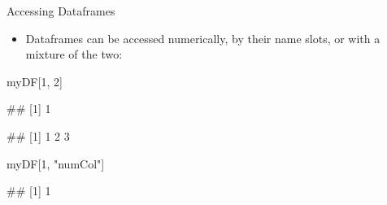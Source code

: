 \documentclass[
  ignorenonframetext,
  aspectratio=169]{beamer}
\newenvironment{Shaded}{\begin{snugshade}}{\end{snugshade}}
\newcommand{\CommentTok}[1]{\textcolor[rgb]{0.56,0.35,0.01}{\textit{#1}}}
\newcommand{\DecValTok}[1]{\textcolor[rgb]{0.00,0.00,0.81}{#1}}
\newcommand{\NormalTok}[1]{#1}
\newcommand{\SpecialCharTok}[1]{\textcolor[rgb]{0.81,0.36,0.00}{\textbf{#1}}}
\newcommand{\StringTok}[1]{\textcolor[rgb]{0.31,0.60,0.02}{#1}}
\providecommand{\tightlist}{%
  \setlength{\itemsep}{0pt}\setlength{\parskip}{0pt}}
\let\oldShaded\Shaded %
\let\endoldShaded\endShaded
\renewenvironment{Shaded}{\footnotesize\oldShaded}{\endoldShaded}
\let\oldverbatim\verbatim %Change fontsize of code chunk output
\let\endoldverbatim\endverbatim
\renewenvironment{verbatim}{\footnotesize\oldverbatim}{\endoldverbatim}
\begin{document}
\begin{frame}[fragile]{Accessing Dataframes}
\protect\hypertarget{accessing-dataframes}{}
\begin{itemize}[<+->]
\tightlist
\item
  Dataframes can be accessed numerically, by their name slots, or with a
  mixture of the two:
\end{itemize}

\begin{Shaded}
\begin{Highlighting}[]
\NormalTok{myDF[}\DecValTok{1}\NormalTok{, }\DecValTok{2}\NormalTok{]}
\end{Highlighting}
\end{Shaded}

\begin{verbatim}
## [1] 1
\end{verbatim}

\begin{Shaded}
\end{Shaded}

\begin{verbatim}
## [1] 1 2 3
\end{verbatim}

\begin{Shaded}
\begin{Highlighting}[]
\NormalTok{myDF[}\DecValTok{1}\NormalTok{, }\StringTok{"numCol"}\NormalTok{]}
\end{Highlighting}
\end{Shaded}

\begin{verbatim}
## [1] 1
\end{verbatim}
\end{frame}
\end{document}
